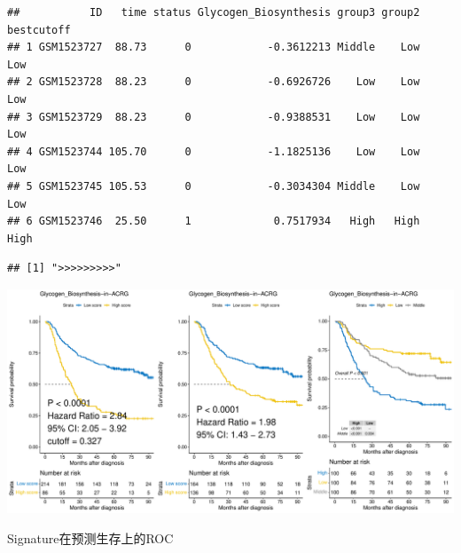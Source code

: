\documentclass[
  12pt,
]{book}
\newenvironment{Shaded}{\begin{snugshade}}{\end{snugshade}}
\newcommand{\NormalTok}[1]{#1}
\newcommand{\SpecialCharTok}[1]{\textcolor[rgb]{0.81,0.36,0.00}{\textbf{#1}}}
\theoremstyle{definition}
\theoremstyle{definition}
\theoremstyle{definition}
\theoremstyle{definition}
\theoremstyle{remark}
\begin{document}
\begin{verbatim}
##           ID   time status Glycogen_Biosynthesis group3 group2 bestcutoff
## 1 GSM1523727  88.73      0            -0.3612213 Middle    Low        Low
## 2 GSM1523728  88.23      0            -0.6926726    Low    Low        Low
## 3 GSM1523729  88.23      0            -0.9388531    Low    Low        Low
## 4 GSM1523744 105.70      0            -1.1825136    Low    Low        Low
## 5 GSM1523745 105.53      0            -0.3034304 Middle    Low        Low
## 6 GSM1523746  25.50      1             0.7517934   High   High       High
\end{verbatim}

\begin{verbatim}
## [1] ">>>>>>>>>"
\end{verbatim}

\begin{Shaded}
\end{Shaded}

\includegraphics{_main_files/figure-latex/unnamed-chunk-36-1.pdf}

Signature在预测生存上的ROC
\end{document}
